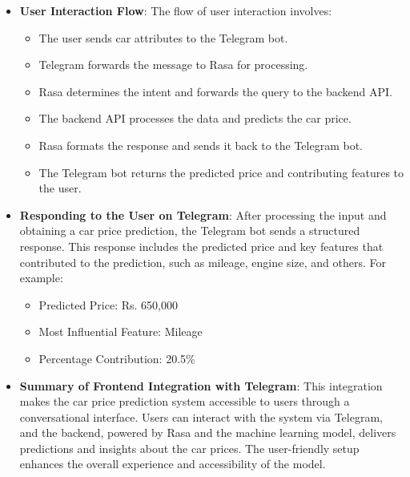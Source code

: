 \documentclass[a4paper,12pt]{article}
\begin{document}
\begin{justify}
\begin{itemize}
		\item \textbf{User Interaction Flow}: The flow of user interaction involves:
		\begin{itemize}
			\item The user sends car attributes to the Telegram bot.
			\item Telegram forwards the message to Rasa for processing.
			\item Rasa determines the intent and forwards the query to the backend API.
			\item The backend API processes the data and predicts the car price.
			\item Rasa formats the response and sends it back to the Telegram bot.
			\item The Telegram bot returns the predicted price and contributing features to the user.
		\end{itemize}
		
		\item \textbf{Responding to the User on Telegram}: After processing the input and obtaining a car price prediction, the Telegram bot sends a structured response. This response includes the predicted price and key features that contributed to the prediction, such as mileage, engine size, and others. For example:
		\begin{itemize}
			\item Predicted Price: Rs. 650,000
			\item Most Influential Feature: Mileage
			\item Percentage Contribution: 20.5\%
		\end{itemize}
		
		
		\item \textbf{Summary of Frontend Integration with Telegram}: This integration makes the car price prediction system accessible to users through a conversational interface. Users can interact with the system via Telegram, and the backend, powered by Rasa and the machine learning model, delivers predictions and insights about the car prices. The user-friendly setup enhances the overall experience and accessibility of the model.
	\end{itemize}
\end{justify}
\end{document}
